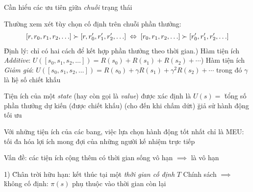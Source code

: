 \documentclass{article}
\begin{document}
\begin{huge}
\vspace*{0.2in}

\textwidth
{}


\vspace*{0.2in}

\textwidth
{}




Cần hiểu các ưu tiên giữa {\em chuỗi} trạng thái

Thường xem xét \u{tùy chọn cố định} trên chuỗi phần thưởng:
\[
  [r,r_0,r_1,r_2,\ldots]\mathrel{\succ} [r,r'_0,r'_1,r'_2,\ldots]
  \;\;{\Leftrightarrow}\;\;
  [r_0,r_1,r_2,\ldots]\mathrel{\succ} [r'_0,r'_1,r'_2,\ldots]
\]  
\u{Định lý}: chỉ có hai cách để kết hợp phần thưởng theo thời gian.) Hàm tiện ích {\em Additive}:\nl
   $U([s_0,s_1,s_2,\ldots]) = R(s_0) + R(s_1) + R(s_2) + \cdots $) Hàm tiện ích {\em Giảm giá}:\nl
   $U([s_0,s_1,s_2,\ldots]) = R(s_0) + \gamma R(s_1) + \gamma^2 R(s_2) + \cdots $\nl
   trong đó $\gamma$ là \u{hệ số chiết khấu}


Tiện ích của một {\em state} (hay còn gọi là {\em value}) được xác định là \nl
$U(s) = {}$ \u{tổng số phần thưởng dự kiến (được chiết khấu) (cho đến khi chấm dứt)}\nl
{} \u{giả sử hành động tối ưu}

Với những tiện ích của các bang, việc lựa chọn hành động tốt nhất chỉ là MEU:\al
  tối đa hóa lợi ích mong đợi của những người kế nhiệm trực tiếp 

\vspace*{0.2in}




Vấn đề: các tiện ích cộng thêm có thời gian sống vô hạn $\implies$ là vô hạn

1) \u{Chân trời hữu hạn}: kết thúc tại một {\em thời gian cố định} $T$\al
  Chính sách $\implies$ \u{không cố định}: $\pi(s)$ phụ thuộc vào thời gian còn lại


\end{huge}
\end{document}
